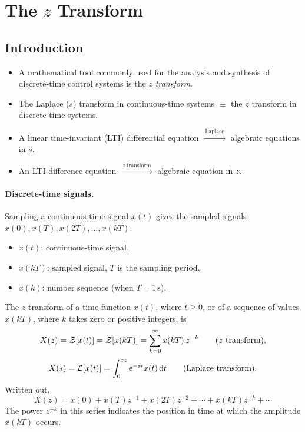 \section{The $z$ Transform}\label{sec:ztransform}

\subsection{Introduction}
\begin{itemize}
  \item A mathematical tool commonly used for the analysis and synthesis of discrete-time control systems is
        the \emph{$z$ transform}.
  \item The Laplace ($s$) transform in continuous-time systems $\equiv$ the $z$ transform in discrete-time
        systems.
  \item A linear time-invariant (LTI) differential equation $\xrightarrow{\ \text{Laplace}\ }$ algebraic
        equations in $s$.
  \item An LTI difference equation $\xrightarrow{\ z\ \text{transform}\ }$ algebraic equation in $z$.
\end{itemize}

\paragraph{Discrete-time signals.} Sampling a continuous-time signal $x(t)$ gives the sampled signals
$x(0),x(T),x(2T),\dots,x(kT)$.
\begin{itemize}
  \item $x(t)$: continuous-time signal,
  \item $x(kT)$: sampled signal, $T$ is the sampling period,
  \item $x(k)$: number sequence (when $T=1\,\mathrm{s}$).
\end{itemize}

The $z$ transform of a time function $x(t)$, where $t\ge0$, or of a sequence of values $x(kT)$, where $k$
takes zero or positive integers, is
\begin{equation}
  X(z)=\ZT{x(t)}=\ZT{x(kT)}=\sum_{k=0}^{\infty}x(kT)\,z^{-k}\qquad(z\ \text{transform}),
\end{equation}
\begin{equation}
  X(s)=\mathcal{L}\!\left[x(t)\right]=\int_0^{\infty}\mathrm{e}^{-st}x(t)\,\mathrm{d} t\qquad(\text{Laplace transform}).
\end{equation}
Written out,
\[
  X(z)=x(0)+x(T)z^{-1}+x(2T)z^{-2}+\cdots+x(kT)z^{-k}+\cdots
\]
The power $z^{-k}$ in this series indicates the position in time at which the amplitude $x(kT)$ occurs.

